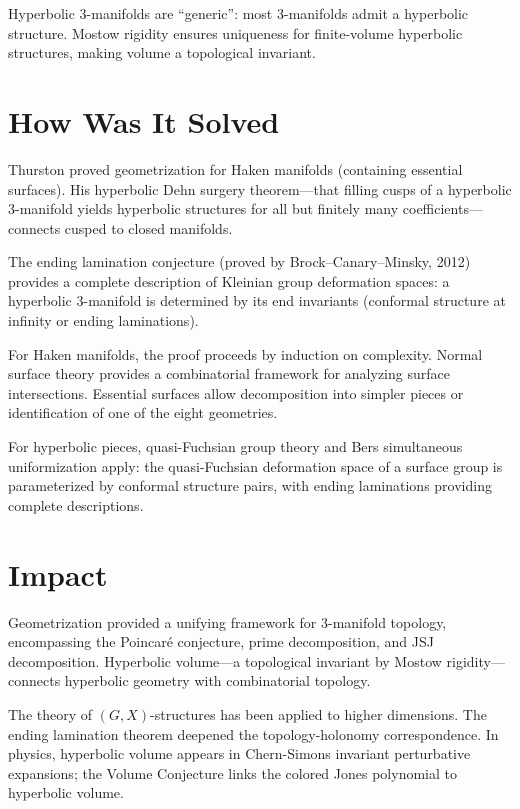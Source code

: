 Hyperbolic 3-manifolds are ``generic'': most 3-manifolds admit a
hyperbolic structure. Mostow rigidity ensures uniqueness for
finite-volume hyperbolic structures, making volume a topological
invariant.

\section*{How Was It Solved}

Thurston proved geometrization for Haken manifolds (containing essential
surfaces). His hyperbolic Dehn surgery theorem---that filling cusps of a
hyperbolic 3-manifold yields hyperbolic structures for all but finitely
many coefficients---connects cusped to closed manifolds.

The ending lamination conjecture (proved by Brock--Canary--Minsky, 2012)
provides a complete description of Kleinian group deformation spaces: a
hyperbolic 3-manifold is determined by its end invariants (conformal
structure at infinity or ending laminations).

For Haken manifolds, the proof proceeds by induction on complexity. Normal
surface theory provides a combinatorial framework for analyzing surface
intersections. Essential surfaces allow decomposition into simpler pieces
or identification of one of the eight geometries.

For hyperbolic pieces, quasi-Fuchsian group theory and Bers simultaneous
uniformization apply: the quasi-Fuchsian deformation space of a surface
group is parameterized by conformal structure pairs, with ending
laminations providing complete descriptions.

\section*{Impact}

Geometrization provided a unifying framework for 3-manifold topology,
encompassing the Poincar\'{e} conjecture, prime decomposition, and JSJ
decomposition. Hyperbolic volume---a topological invariant by Mostow
rigidity---connects hyperbolic geometry with combinatorial topology.

The theory of $(G, X)$-structures has been applied to higher dimensions.
The ending lamination theorem deepened the topology-holonomy
correspondence. In physics, hyperbolic volume appears in Chern-Simons
invariant perturbative expansions; the Volume Conjecture links the
colored Jones polynomial to hyperbolic volume.

